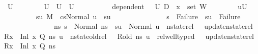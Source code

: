 \begin{isabellebody}
\ U{}\ \isanewline
\ \ \ \ \ \ \ {\isachardoublequoteopen}U{}\ {\isasymsubseteq}\ {\isacharquery}{\kern0pt}U{}{\isachardoublequoteclose}\ \ {\isachardoublequoteopen}U{}\ {\isasymnoteq}\ {\isacharbraceleft}{\kern0pt}{\isacharbraceright}{\kern0pt}{\isachardoublequoteclose}\ \isanewline
\ \ \ \ \ \ \ {\isachardoublequoteopen}dependent\ {\isasymLambda}{\isacharprime}{\kern0pt}\ {\isasymOmega}\ U{}\ {\isacharparenleft}{\kern0pt}D{}\ {\isasymunion}\ {\isacharbraceleft}{\kern0pt}x{\isacharprime}{\kern0pt}{\isacharbraceright}{\kern0pt}\ {\isasymunion}\ set\ W{\isacharparenright}{\kern0pt}{\isachardoublequoteclose}\ \isanewline
\ \ \ \ \ \ \ {\isachardoublequoteopen}{\isacharparenleft}{\kern0pt}{\isasymforall}u{\isasymin}U{}{\isachardot}{\kern0pt}\isanewline
\ \ \ \ \ \ \ \ \ {\isasymexists}su{\isachardot}{\kern0pt}\ {\isacharparenleft}{\kern0pt}M{\isacharcomma}{\kern0pt}{\isasymLambda}{\isacharprime}{\kern0pt}{\isacharcomma}{\kern0pt}{\isasymGamma}{\isacharcomma}{\kern0pt}{\isasymOmega}\ {\isasymturnstile}\ {\isasymlangle}cs{}{\isacharcomma}{\kern0pt}Normal\ u{\isasymrangle}\ {\isacharbrackleft}{\kern0pt}{\isasymrightarrow}{\isacharbrackright}{\kern0pt}\ su{\isacharparenright}{\kern0pt}\ {\isasymand}\isanewline
\ \ \ \ \ \ \ \ \ \ \ \ \ \ {\isacharparenleft}{\kern0pt}s{\isacharprime}{\kern0pt}\ {\isacharequal}{\kern0pt}\ Failure\ {\isasymlongrightarrow}\ su\ {\isacharequal}{\kern0pt}\ Failure{\isacharparenright}{\kern0pt}\ {\isasymand}\isanewline
\ \ \ \ \ \ \ \ \ \ \ \ \ \ {\isacharparenleft}{\kern0pt}{\isasymforall}ns{\isacharprime}{\kern0pt}{\isachardot}{\kern0pt}\ s{\isacharprime}{\kern0pt}\ {\isacharequal}{\kern0pt}\ Normal\ ns{\isacharprime}{\kern0pt}\ {\isasymlongrightarrow}\ su\ {\isacharequal}{\kern0pt}\ Normal\ u\ {\isasymand}\ nstate{\isacharunderscore}{\kern0pt}rel\ {\isasymLambda}\ {\isasymLambda}{\isacharprime}{\kern0pt}\ {\isacharparenleft}{\kern0pt}update{\isacharunderscore}{\kern0pt}nstate{\isacharunderscore}{\kern0pt}rel\ {\isacharparenleft}{\kern0pt}R{\isacharparenleft}{\kern0pt}x\ {\isasymmapsto}\ Inl\ x{\isacharprime}{\kern0pt}{\isacharparenright}{\kern0pt}{\isacharparenright}{\kern0pt}\ Q{\isacharparenright}{\kern0pt}\ ns{\isacharprime}{\kern0pt}\ u\ {\isasymand}\ nstate{\isacharunderscore}{\kern0pt}old{\isacharunderscore}{\kern0pt}rel\ {\isasymLambda}\ {\isasymLambda}{\isacharprime}{\kern0pt}\ R{\isacharunderscore}{\kern0pt}old\ ns{\isacharprime}{\kern0pt}\ u\ {\isasymand}\ rel{\isacharunderscore}{\kern0pt}well{\isacharunderscore}{\kern0pt}typed\ {\isasymLambda}\ {\isasymOmega}\ {\isacharparenleft}{\kern0pt}update{\isacharunderscore}{\kern0pt}nstate{\isacharunderscore}{\kern0pt}rel\ {\isacharparenleft}{\kern0pt}R{\isacharparenleft}{\kern0pt}x\ {\isasymmapsto}\ Inl\ x{\isacharprime}{\kern0pt}{\isacharparenright}{\kern0pt}{\isacharparenright}{\kern0pt}\ Q{\isacharparenright}{\kern0pt}\ ns{\isacharprime}{\kern0pt}{\isacharparenright}{\kern0pt}{\isacharparenright}{\kern0pt}{\isachardoublequoteclose}\isanewline

\end{isabellebody}
